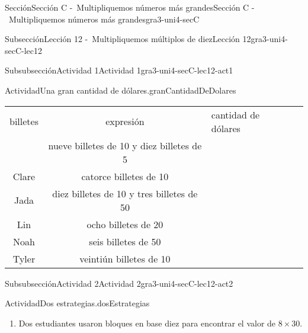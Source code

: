 \documentclass[twoside,10pt,]{article}
\newcommand{\hrulethick} {\noalign{\hrule height 0.11em}}
\begin{document}
\begin{sectionptx}{Sección}{Sección C -~Multipliquemos números más grandes}{}{Sección C -~Multipliquemos números más grandes}{}{}{gra3-uni4-secC}
\begin{subsectionptx}{Subsección}{Lección 12 -~Multipliquemos múltiplos de diez}{}{Lección 12}{}{}{gra3-uni4-secC-lec12}
\begin{subsubsectionptx}{Subsubsección}{Actividad 1}{}{Actividad 1}{}{}{gra3-uni4-secC-lec12-act1}
\begin{activity}{Actividad}{Una gran cantidad de dólares.}{granCantidadDeDolares}
\begin{enumerate}
\begin{center}
{\begin{tabular}{ccll}
{billetes%
}&\multicolumn{1}{m{0.25\linewidth}}{\raggedright%
expresión%
}&\multicolumn{1}{m{0.25\linewidth}}{\raggedright%
cantidad de dólares%
}\tabularnewline\hrulethick
\multicolumn{1}{m{0.15\linewidth}}{\centering%
Andre%
}&\multicolumn{1}{m{0.35\linewidth}}{\centering%
nueve billetes de \textdollar{}10 y diez billetes de \textdollar{}5%
}&\multicolumn{1}{m{0.25\linewidth}}{\raggedright%
%
}&\multicolumn{1}{m{0.25\linewidth}}{\raggedright%
%
}\tabularnewline[0pt]
\multicolumn{1}{m{0.15\linewidth}}{\centering%
Clare%
}&\multicolumn{1}{m{0.35\linewidth}}{\centering%
catorce billetes de \textdollar{}10%
}&\multicolumn{1}{m{0.25\linewidth}}{\raggedright%
%
}&\multicolumn{1}{m{0.25\linewidth}}{\raggedright%
%
}\tabularnewline[0pt]
\multicolumn{1}{m{0.15\linewidth}}{\centering%
Jada%
}&\multicolumn{1}{m{0.35\linewidth}}{\centering%
diez billetes de \textdollar{}10 y tres billetes de \textdollar{}50%
}&\multicolumn{1}{m{0.25\linewidth}}{\raggedright%
%
}&\multicolumn{1}{m{0.25\linewidth}}{\raggedright%
%
}\tabularnewline[0pt]
\multicolumn{1}{m{0.15\linewidth}}{\centering%
Lin%
}&\multicolumn{1}{m{0.35\linewidth}}{\centering%
ocho billetes de \textdollar{}20%
}&\multicolumn{1}{m{0.25\linewidth}}{\raggedright%
%
}&\multicolumn{1}{m{0.25\linewidth}}{\raggedright%
%
}\tabularnewline[0pt]
\multicolumn{1}{m{0.15\linewidth}}{\centering%
Noah%
}&\multicolumn{1}{m{0.35\linewidth}}{\centering%
seis billetes de \textdollar{}50%
}&\multicolumn{1}{m{0.25\linewidth}}{\raggedright%
%
}&\multicolumn{1}{m{0.25\linewidth}}{\raggedright%
%
}\tabularnewline[0pt]
\multicolumn{1}{m{0.15\linewidth}}{\centering%
Tyler%
}&\multicolumn{1}{m{0.35\linewidth}}{\centering%
veintiún billetes de \textdollar{}10%
}&\multicolumn{1}{m{0.25\linewidth}}{\raggedright%
%
}&\multicolumn{1}{m{0.25\linewidth}}{\raggedright%
%
}
\end{tabular}
}%
\end{center}%
\end{enumerate}
\end{activity}%
\end{subsubsectionptx}
%
%
\typeout{************************************************}
\typeout{************************************************}
%
\begin{subsubsectionptx}{Subsubsección}{Actividad 2}{}{Actividad 2}{}{}{gra3-uni4-secC-lec12-act2}
\begin{activity}{Actividad}{Dos estrategias.}{dosEstrategias}%
%
\begin{enumerate}
\item{}Dos estudiantes usaron bloques en base diez para encontrar el valor de \(8\times 30\).%

\end{enumerate}
\end{activity}
\end{subsubsectionptx}
\end{subsectionptx}
\end{sectionptx}
\end{document}

